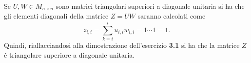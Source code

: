 Se $U,W \in M_{n \times n}$ sono matrici triangolari superiori a diagonale unitaria si ha che gli elementi diagonali della matrice $Z=UW$ saranno calcolati come
\[
z_{i,i} = \sum_{k=i}^{i} u_{i,i}w_{i,i} = 1 \cdots 1 = 1.
\]
Quindi, riallacciandosi alla dimostrazione dell'esercizio \textbf{3.1} si ha che la matrice $Z$ \'e triangolare superiore a diagonale unitaria.